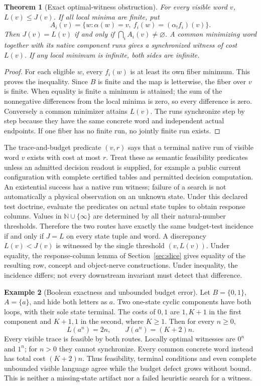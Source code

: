 \documentclass[11pt]{article}
\newtheorem{theorem}{Theorem}[section]
\theoremstyle{definition}\newtheorem{definition}[theorem]{Definition}
\newtheorem{example}[theorem]{Example}
\theoremstyle{remark}\newtheorem{remark}[theorem]{Remark}
\newcommand{\Cost}{\mathbb N\cup\{\infty\}}
\begin{document}
\begin{theorem}[Exact optimal-witness obstruction]\label{thm:native-gap}
For every visible word $v$, $L(v)\leq J(v)$. If all local minima are
finite, put
\[
 A_i(v)=\{w:\alpha(w)=v,\ f_i(w)=(\alpha_!f_i)(v)\}.
\]
Then $J(v)=L(v)$ if and only if $\bigcap_iA_i(v)\ne\varnothing$.
A common minimizing word together with its native component runs gives
a synchronized witness of cost $L(v)$. If any local minimum is infinite,
both sides are infinite.
\end{theorem}
\begin{proof}
For each eligible $w$, every $f_i(w)$ is at least its own fiber minimum.
This proves the inequality. Since $B$ is finite and the map is letterwise,
the fiber over $v$ is finite. When equality is finite a minimum is attained;
the sum of the nonnegative differences from the local minima is zero,
so every difference is zero. Conversely a common minimizer attains $L(v)$.
The runs synchronize step by step because they have the same concrete
word and independent actual endpoints. If one fiber has no finite run,
no jointly finite run exists.
\end{proof}

The trace-and-budget predicate $(v,r)$ says that a terminal native run
of visible word $v$ exists with cost at most $r$. Treat these as semantic
feasibility predicates unless an admitted decision readout is supplied,
for example a public current configuration with complete certified tables
and permitted decision computation. An existential success has a native
run witness; failure of a search is not automatically a physical observation
on an unknown state. Under this declared test doctrine, evaluate the
predicates on actual state tuples to obtain response columns. Values in $\Cost$ are determined
by all their natural-number thresholds. Therefore the two routes have
exactly the same budget-test incidence if and only if $J=L$ on every
state tuple and word. A discrepancy $L(v)<J(v)$ is witnessed by the
single threshold $(v,L(v))$. Under equality, the response-column lemma
of Section~\ref{sec:slice} gives equality of the resulting row, concept
and object-nerve constructions. Under inequality, the incidence differs;
not every downstream invariant must detect that difference.

\begin{example}[Boolean exactness and unbounded budget error]
Let $B=\{0,1\}$, $A=\{a\}$, and hide both letters as $a$.
Two one-state cyclic components have both loops, with their sole state
terminal. The costs of $0,1$ are $1,K+1$ in the first component and
$K+1,1$ in the second, where $K\geq1$. Then for every $n\geq0$,
\[
 L(a^n)=2n,\qquad J(a^n)=(K+2)n.
\]
Every visible trace is feasible by both routes. Locally optimal witnesses
are $0^n$ and $1^n$; for $n>0$ they cannot synchronize. Every common
concrete word instead has total cost $(K+2)n$. Thus feasibility, terminal
conditions and even complete unbounded visible language agree while the
budget defect grows without bound. This is neither a missing-state
artifact nor a failed heuristic search for a witness.
\end{example}
\end{document}
